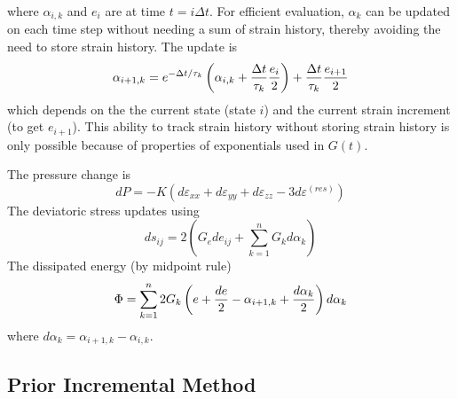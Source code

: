 \documentclass[11pt]{article}
\def\e#1{\varepsilon_{#1}}
\def\er#1{\varepsilon_{#1}^{(res)}}
\begin{document}
where $\alpha_{i,k}$ and $e_i$ are at time $t=i\Delta t$.
For efficient evaluation, $\alpha_k$ can be updated on each time step without needing a sum of strain history, thereby avoiding the need to store strain history. The update is
\begin{equation}
     \alpha_{i+1,k} = e^{-\Delta t/\tau_k}\left(\alpha_{i,k}+ {\Delta t\over \tau_k}{e_i\over 2}\right) + {\Delta t\over \tau_k}{e_{i+1}\over 2}
\end{equation}
which depends on the the current state (state $i$) and the current strain increment (to get $e_{i+1}$). This ability to track strain history without storing strain history is only possible because of properties of exponentials used in $G(t)$.

The pressure change is
\begin{equation}
     dP = -K(d\e{xx} + d\e{yy} + d\e{zz} - 3d\er{})
\end{equation}
The deviatoric stress updates using
\begin{equation}
     ds_{ij} = 2\left( G_e de_{ij} +   \sum_{k=1}^n G_k d\alpha_k \right)
\end{equation}
The dissipated energy (by midpoint rule)
\begin{equation}
     \Phi = \sum_{k=1}^n 2G_k\left(e+{de\over 2}-\alpha_{i+1,k}+{d\alpha_k\over 2}\right) d\alpha_k
\end{equation}
where $d\alpha_k = \alpha_{i+1,k} -\alpha_{i,k}$.




\subsection{Prior Incremental Method}
\end{document}
